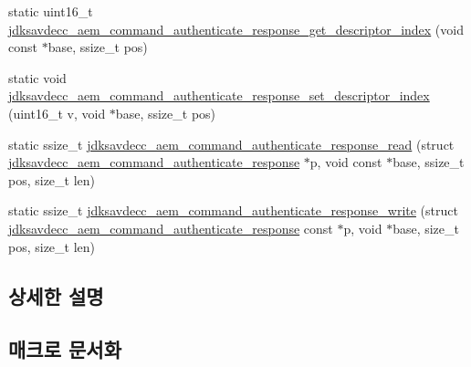 \begin{DoxyCompactItemize}
\item 
static uint16\+\_\+t \hyperlink{group__command__authenticate__response_ga927e1523cf2f235015420c9865df8625}{jdksavdecc\+\_\+aem\+\_\+command\+\_\+authenticate\+\_\+response\+\_\+get\+\_\+descriptor\+\_\+index} (void const $\ast$base, ssize\+\_\+t pos)
\item 
static void \hyperlink{group__command__authenticate__response_ga1598cde6cdd60025f41f61b1a7e7d770}{jdksavdecc\+\_\+aem\+\_\+command\+\_\+authenticate\+\_\+response\+\_\+set\+\_\+descriptor\+\_\+index} (uint16\+\_\+t v, void $\ast$base, ssize\+\_\+t pos)
\item 
static ssize\+\_\+t \hyperlink{group__command__authenticate__response_ga7fa3e56797f6e54d7b851884c9a266e2}{jdksavdecc\+\_\+aem\+\_\+command\+\_\+authenticate\+\_\+response\+\_\+read} (struct \hyperlink{structjdksavdecc__aem__command__authenticate__response}{jdksavdecc\+\_\+aem\+\_\+command\+\_\+authenticate\+\_\+response} $\ast$p, void const $\ast$base, ssize\+\_\+t pos, size\+\_\+t len)
\item 
static ssize\+\_\+t \hyperlink{group__command__authenticate__response_gafbdd585ecce165d2672502a3510daf41}{jdksavdecc\+\_\+aem\+\_\+command\+\_\+authenticate\+\_\+response\+\_\+write} (struct \hyperlink{structjdksavdecc__aem__command__authenticate__response}{jdksavdecc\+\_\+aem\+\_\+command\+\_\+authenticate\+\_\+response} const $\ast$p, void $\ast$base, size\+\_\+t pos, size\+\_\+t len)
\end{DoxyCompactItemize}


\subsection{상세한 설명}


\subsection{매크로 문서화}
